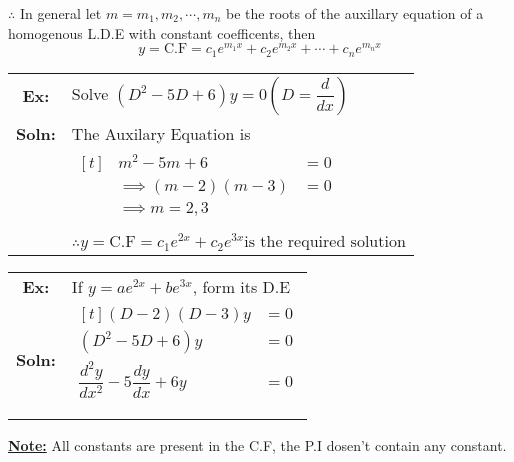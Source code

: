 \documentclass[a4paper, titlepage]{article}
\begin{document}
    $ \therefore $ In general let $ m = m_1, m_2, \cdots, m_n $ be the roots
    of the auxillary equation of a homogenous L.D.E with constant coefficents, 
    then
    $$ y = \text{C.F} = c_1e^{m_1x} + c_2e^{m_2x} + \cdots + c_ne^{m_nx} $$
    \begin{tabularx}{\linewidth}{c l}
        \textbf{Ex:} & Solve 
        $ (D^2 - 5D + 6)y = 0 \left( D = \dfrac{d}{dx} \right) $ \\
        \textbf{Soln: } 
        & The Auxilary Equation is \\
        \hfill 
        &
        $
            \begin{aligned}[t]
                & m^2 - 5m + 6 &= 0 \\
                & \implies (m-2)(m-3) &= 0 \\
                & \implies m = 2, 3 \\
            \end{aligned}
        $ \\
        \hfill 
        &
        $ \therefore y = \text{C.F} = c_1e^{2x} + c_2e^{3x} \text{is the 
        required solution} $ \\
    \end{tabularx}
    \begin{tabularx}{\linewidth}{c l}
        \\
        \textbf{Ex:} & If $ y = ae^{2x} + be^{3x} $, form its D.E \\
        \textbf{Soln: } 
        &
        $
            \begin{aligned}[t]
                (D-2)(D-3)y &= 0 \\
                (D^2 -5D + 6)y &= 0 \\
                \dfrac{d^2y}{dx^2} - 5\dfrac{dy}{dx} + 6y &= 0 \\ \\
            \end{aligned}
        $
    \end{tabularx}
    \underline{\textbf{Note:}} All constants are present in the C.F, the P.I
    dosen't contain any constant. \hfill \\
    \begin{center}
        \date{$6^{\text{th}}$ September 2021}
    \end{center}
\end{document}
